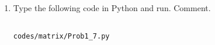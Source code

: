 \begin{enumerate}[label=\arabic*.,ref=\thesubsection.\theenumi]

%
%
%
%
%
%
%
%

%
\item
	Type the following code in Python and run.  Comment.

%
\begin{lstlisting}
 
codes/matrix/Prob1_7.py
\end{lstlisting}
\end{enumerate}

